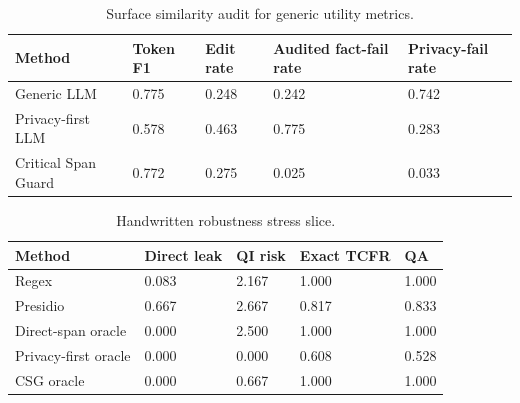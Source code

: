 \begin{table}[t]
\centering
\begin{tabular}{lllll}
\toprule
Method & Token F1 & Edit rate & Audited fact-fail rate & Privacy-fail rate \\
\midrule
Generic LLM & 0.775 & 0.248 & 0.242 & 0.742 \\
Privacy-first LLM & 0.578 & 0.463 & 0.775 & 0.283 \\
Critical Span Guard & 0.772 & 0.275 & 0.025 & 0.033 \\
\bottomrule
\end{tabular}
\caption{Surface similarity audit for generic utility metrics.}
\end{table}

\begin{table}[t]
\centering
\begin{tabular}{lllll}
\toprule
Method & Direct leak & QI risk & Exact TCFR & QA \\
\midrule
Regex & 0.083 & 2.167 & 1.000 & 1.000 \\
Presidio & 0.667 & 2.667 & 0.817 & 0.833 \\
Direct-span oracle & 0.000 & 2.500 & 1.000 & 1.000 \\
Privacy-first oracle & 0.000 & 0.000 & 0.608 & 0.528 \\
CSG oracle & 0.000 & 0.667 & 1.000 & 1.000 \\
\bottomrule
\end{tabular}
\caption{Handwritten robustness stress slice.}
\end{table}
